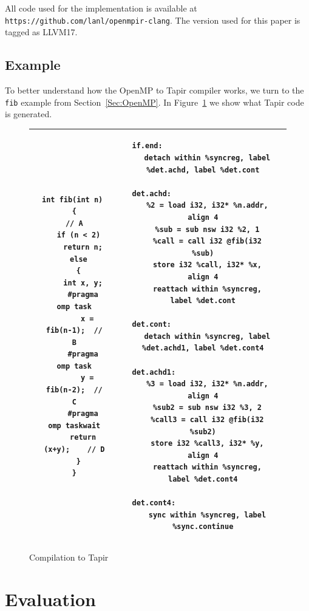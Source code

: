 \documentclass[sigconf]{acmart}
\begin{document}
All code used for the implementation is available at \\
\texttt{https://github.com/lanl/openmpir-clang}. The version used for this
paper is tagged as LLVM17.

\subsection{Example} \label{Sec:Example}

To better understand how the OpenMP to Tapir compiler works, we turn to the
\texttt{fib} example from Section~\ref{Sec:OpenMP}. In Figure~\ref{Fig:Example}
we show what Tapir code is generated.  

\begin{figure}
\begin{tabular}{| c c c | c c c |}
\hline
 & 
\begin{lstlisting}
int fib(int n) 
{                    // A
  if (n < 2)
    return n;
  else
  {
    int x, y;
    #pragma omp task
      x = fib(n-1);  // B
    #pragma omp task
      y = fib(n-2);  // C
    #pragma omp taskwait
    return (x+y);    // D
  }
}
\end{lstlisting}
& & &
\begin{lstlisting}
if.end:                                 
  detach within %syncreg, label %det.achd, label %det.cont

det.achd:                                 
  %2 = load i32, i32* %n.addr, align 4
  %sub = sub nsw i32 %2, 1
  %call = call i32 @fib(i32 %sub)
  store i32 %call, i32* %x, align 4
  reattach within %syncreg, label %det.cont

det.cont:                                   
  detach within %syncreg, label %det.achd1, label %det.cont4

det.achd1:                                
  %3 = load i32, i32* %n.addr, align 4
  %sub2 = sub nsw i32 %3, 2
  %call3 = call i32 @fib(i32 %sub2)
  store i32 %call3, i32* %y, align 4
  reattach within %syncreg, label %det.cont4

det.cont4:                                  
  sync within %syncreg, label %sync.continue
\end{lstlisting}
 &  \\
\hline
\end{tabular}

\caption{Compilation to Tapir}
\label{Fig:Example}
\end{figure}

\section{Evaluation} \label{Sec:Evaluation}
\end{document}
